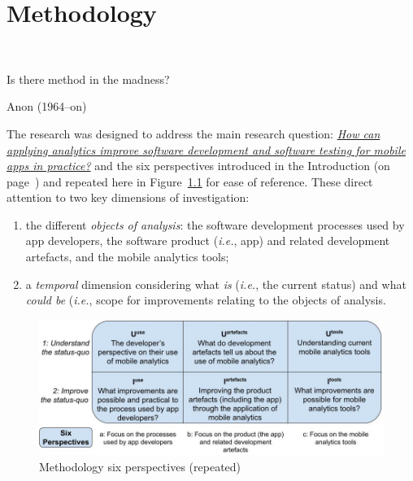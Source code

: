 \setchapterpreamble[u]{\margintoc}
\chapter{Methodology}~\label{chapter-methodology}

\epigraph{Is there method in the madness?}{Anon (1964--on)}



The research was designed to address the main research question: \href{overall-research-question}{\emph{How can applying analytics improve software development and software testing for mobile apps in practice?}} and the six perspectives introduced in the Introduction (on page~\pageref{rq-leads-to-six-perspectives}) and repeated here in Figure~\ref{fig:six-perspectives-in-the-methodology} for ease of reference.  These direct attention to two key dimensions of investigation:
\begin{enumerate}
    \item the different \emph{objects of analysis}: the software development processes used by app developers, the software product (\emph{i.e.}, app) and related development artefacts, and the mobile analytics tools; 
    
    \item a \emph{temporal} dimension considering what \emph{is} (\emph{i.e.}, the current status) and what \emph{could be} (\emph{i.e.}, scope for improvements relating to the objects of analysis.
\end{enumerate}

\begin{figure}
    \centering
    \includegraphics[width=\linewidth]{images/my/six-perspectives-2x3-matrix-12-nov-2021.jpeg}
    \caption{Methodology six perspectives (repeated)}
    \label{fig:six-perspectives-in-the-methodology}
\end{figure}

